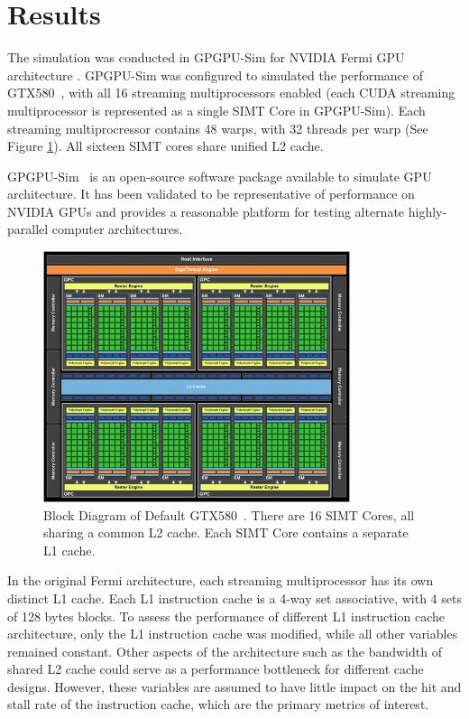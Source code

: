 \section{Results}

The simulation was conducted in GPGPU-Sim for NVIDIA Fermi GPU
architecture \cite{bakhodayuan09}. 
GPGPU-Sim was configured to simulated the performance of
GTX580~\cite{gf100}, with all 16 streaming multiprocessors enabled
(each CUDA streaming multiprocessor is represented as a single SIMT
Core in GPGPU-Sim). 
Each streaming multiprocressor contains 48 warps, with 32 threads per
warp (See Figure \ref{GTX580}). 
All sixteen SIMT cores share unified L2 cache.

GPGPU-Sim~\cite{bakhodayuan09} is an open-source software package
available to simulate GPU architecture. 
It has been validated to be representative of performance on NVIDIA
GPUs and provides a reasonable platform for testing alternate
highly-parallel computer architectures.

\begin{figure}[ht!]
\centering
\includegraphics[width=90mm]{graphics/GTX580.jpg}
\caption{Block Diagram of Default GTX580~\cite{gf100}. There are 16 SIMT Cores, all sharing a common L2 cache. Each SIMT Core contains a separate L1 cache.}
\label{GTX580}
\end{figure}

In the original Fermi architecture, each streaming multiprocessor has
its own distinct L1 cache. 
Each L1 instruction cache is a 4-way set associative, with 4 sets of
128 bytes blocks. 
To assess the  performance of different L1 instruction cache
architecture, only the L1 instruction cache was modified, while all
other variables remained constant. 
Other aspects of the architecture such as the bandwidth of shared L2
cache could serve as a performance bottleneck for different cache
designs. 
However, these variables are assumed to have little impact on the hit
and stall rate of the instruction cache, which are the primary metrics
of interest.

